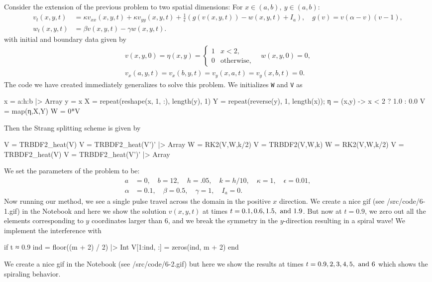\documentclass[12pt]{report}
\begin{document}
\begin{solution}

    \noindent
    Consider the extension of the previous problem to two spatial dimensions: For $x \in (a,b), ~y \in (a,b)$:
    \begin{align*}
    v_t(x,y,t) &= \kappa v_{xx}(x,y,t) + \kappa v_{yy}(x,y,t)+  \frac 1 \epsilon \left( g(v(x,y,t)) - w(x,y,t) + I_a \right), \quad g(v) = v (\alpha - v) (v-1),\\
    w_t(x,y,t) &= \beta v(x,y,t) - \gamma w(x,y,t).
    \end{align*}
    with initial and boundary data given by
    \begin{align*}
    v(x,y,0) = \eta(x,y) = \begin{cases} 1 & x < 2,\\
    0 & \text{otherwise}, \end{cases} \quad w(x,y,0) = 0,\\
    v_x(a,y,t) = v_x(b,y,t) = v_y(x,a,t) = v_y(x,b,t) = 0.
    \end{align*}
    The code we have created immediately generalizes to solve this problem. We initializes \verb`W` and \verb`V` as
\begin{jllisting}
x = a:h:b |> Array
y = x
X = repeat(reshape(x, 1, :), length(y), 1)
Y = repeat(reverse(y), 1, length(x));
η = (x,y) -> x < 2 ? 1.0 : 0.0
V = map(η,X,Y)
W = 0*V
\end{jllisting}
Then the Strang splitting scheme is given by
\begin{jllisting}
V = TRBDF2_heat(V)
V = TRBDF2_heat(V')' |> Array
W = RK2(V,W,k/2)
V = TRBDF2(V,W,k)
W = RK2(V,W,k/2)
V = TRBDF2_heat(V)
V = TRBDF2_heat(V')' |> Array
\end{jllisting}
We set the parameters of the problem to be:
\begin{align*}
a &= 0, \quad b = 12, \quad h = .05, \quad k = h/10, \quad \kappa = 1, \quad \epsilon = 0.01,\\ \alpha &= 0.1, \quad \beta = 0.5, \quad \gamma = 1, \quad I_a = 0.
\end{align*}
Now running our method, we see a single pulse travel across the domain in the positive $x$ direction. We create a nice gif (see /src/code/6-1.gif) in the Notebook and here we show the solution $v(x,y,t)$ at times $t=0.1,0.6,1.5,{~\text{and}~} 1.9$. But now at $t=0.9$, we zero out all the elements corresponding to $y$ coordinates larger than $6$, and we break the symmetry in the $y$-direction resulting in a spiral wave! We implement the interference with
\begin{jllisting}
if t ≈ 0.9
    ind = floor((m + 2) / 2) |> Int
    V[1:ind, :] = zeros(ind, m + 2)
end
\end{jllisting}
We create a nice gif in the Notebook (see /src/code/6-2.gif) but here we show the results at times $t=0.9,2,3,4,5,{~\text{and}~} 6$ which shows the spiraling behavior.




\end{solution}
\end{document}
